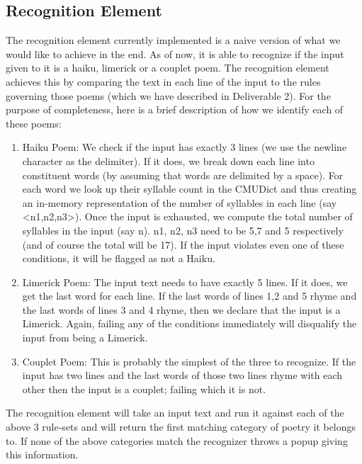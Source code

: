 \documentclass[10pt, letter]{article}
\begin{document}
\subsection*{Recognition Element}
The recognition element currently implemented is a naive version of what we would like to achieve in the end. As of now, it is able to recognize if the input given to it is a haiku, limerick or a couplet poem. The recognition element achieves this by comparing the text in each line of the input to the rules governing those poems (which we have described in Deliverable 2). For the purpose of completeness, here is a brief description of how we identify each of these poems:
\begin{enumerate}
\item Haiku Poem: We check if the input has exactly 3 lines (we use the newline character as the delimiter). If it does, we break down each line into constituent words (by assuming that words are delimited by a space). For each word we look up their syllable count in the CMUDict and thus creating an in-memory representation of the number of syllables in each line (say <n1,n2,n3>). Once the input is exhausted, we compute the total number of syllables in the input (say n). n1, n2, n3 need to be 5,7 and 5 respectively (and of course the total will be 17). If the input violates even one of these conditions, it will be flagged as not a Haiku.

\item Limerick Poem: The input text needs to have exactly 5 lines. If it does, we get the last word for each line. If the last words of lines 1,2 and 5 rhyme and the last words of lines 3 and 4 rhyme, then we declare that the input is a Limerick. Again, failing any of the conditions immediately will disqualify the input from being a Limerick.

\item Couplet Poem: This is probably the simplest of the three to recognize. If the input has two lines and the last words of those two lines rhyme with each other then the input is a couplet; failing which it is not.
\end{enumerate}

The recognition element will take an input text and run it against each of the above 3 rule-sets and will return the first matching category of poetry it belongs to. If none of the above categories match the recognizer throws a popup giving this information.
\end{document}
